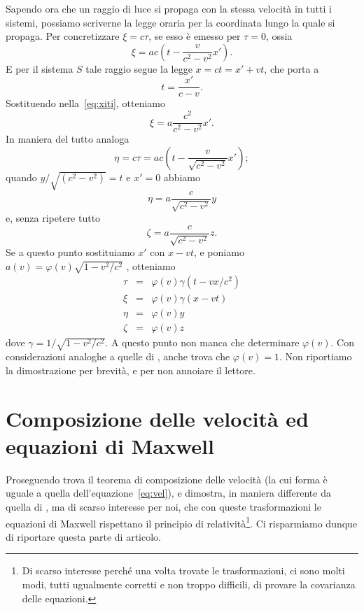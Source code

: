 Sapendo ora che un raggio di luce si propaga con la stessa velocit\`a
in tutti i sistemi, possiamo scriverne la legge oraria per la
coordinata lungo la quale si propaga. Per concretizzare $\xi = c
\tau$, se esso \`e emesso per $\tau = 0$, ossia
\begin{equation}
  \xi = ac (t - \frac{v}{c^{2} - v^{2}}x').
  \label{eq:xiti}
\end{equation}
E per il sistema $S$ tale raggio segue la legge $x = ct = x' + vt$,
che porta a
\begin{equation}
  t = \frac{x'}{c-v}.
\end{equation}
Sostituendo nella~\eqref{eq:xiti}, otteniamo
\begin{equation}
  \xi = a \frac{c^{2}}{c^{2} - v^{2}} x'.
  \label{eq:xi}
\end{equation}
In maniera del tutto analoga
\begin{equation}
  \eta = c \tau = ac (t - \frac{v}{\sqrt{c^{2} - v^{2}}} x' );
\end{equation}
quando $y / \sqrt{(c^{2} - v^{2})} = t$ e $x' = 0$ abbiamo
\begin{equation}
  \eta = a \frac{c}{\sqrt{c^{2} - v^{2}}} y
\end{equation}
e, senza ripetere tutto
\begin{equation}
  \zeta = a \frac{c}{\sqrt{c^{2} - v^{2}}} z.
\end{equation}
Se a questo punto sostituiamo $x'$ con $x - vt$, e poniamo $a (v)=
\varphi (v) \sqrt{1-v^{2}/c^{2}}$ , otteniamo
\begin{equation}
  \begin{array}{rcl}
    \tau & = & \varphi (v) \gamma (t - vx/c^{2})\\
    \xi   & = & \varphi (v) \gamma (x - vt)\\
    \eta & = & \varphi (v) y \\
    \zeta & = & \varphi (v) z		
  \end{array}
\end{equation}
dove $\gamma = 1/\sqrt{1 - v^{2}/c^{2}}$. A questo punto non manca che
determinare $\varphi (v)$. Con considerazioni analoghe a quelle di
\poin, anche \ein{} trova che $\varphi(v) = 1$. Non riportiamo la
dimostrazione per brevit\`a, e per non annoiare il lettore.

\section{Composizione delle velocit\`a ed equazioni di Maxwell}
Proseguendo \ein{} trova il teorema di composizione delle velocit\`a (la
cui forma \`e uguale a quella dell'equazione~\eqref{eq:vel}),
e dimostra, in maniera differente da quella di \poin, ma di scarso
interesse per noi, che con queste trasformazioni le equazioni di
Maxwell rispettano il principio di relativit\`a\footnote{Di scarso
  interesse perch\'e una volta trovate le trasformazioni, ci sono
  molti modi, tutti ugualmente corretti e non troppo difficili, di
  provare la covarianza delle equazioni.}. Ci risparmiamo dunque di
riportare questa parte di articolo.

